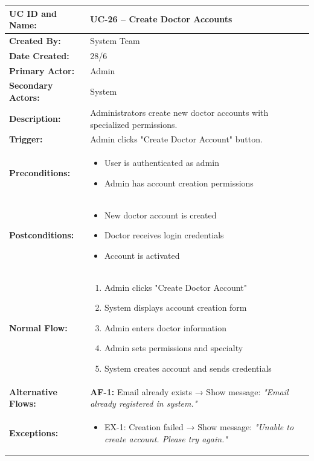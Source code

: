 \documentclass[12pt,a4paper]{article}
\begin{document}
\renewcommand{\arraystretch}{1.5}
\begin{longtable}{|p{4.5cm}|p{10.5cm}|}
\hline
\textbf{UC ID and Name:} & UC-26 – Create Doctor Accounts \\
\hline
\textbf{Created By:} & System Team \\
\hline
\textbf{Date Created:} & 28/6 \\
\hline
\textbf{Primary Actor:} & Admin \\
\hline
\textbf{Secondary Actors:} & System \\
\hline
\textbf{Description:} & Administrators create new doctor accounts with specialized permissions. \\
\hline
\textbf{Trigger:} & Admin clicks "Create Doctor Account" button. \\
\hline
\textbf{Preconditions:} &
\begin{itemize}
  \item User is authenticated as admin
  \item Admin has account creation permissions
\end{itemize} \\
\hline
\textbf{Postconditions:} &
\begin{itemize}
  \item New doctor account is created
  \item Doctor receives login credentials
  \item Account is activated
\end{itemize} \\
\hline
\textbf{Normal Flow:} &
\begin{enumerate}
  \item Admin clicks "Create Doctor Account"
  \item System displays account creation form
  \item Admin enters doctor information
  \item Admin sets permissions and specialty
  \item System creates account and sends credentials
\end{enumerate} \\
\hline
\textbf{Alternative Flows:} &
\textbf{AF-1:} Email already exists → Show message: \textit{"Email already registered in system."} \\
\hline
\textbf{Exceptions:} &
\begin{itemize}
  \item EX-1: Creation failed → Show message: \textit{"Unable to create account. Please try again."}

\end{itemize}
\end{longtable}
\end{document}
